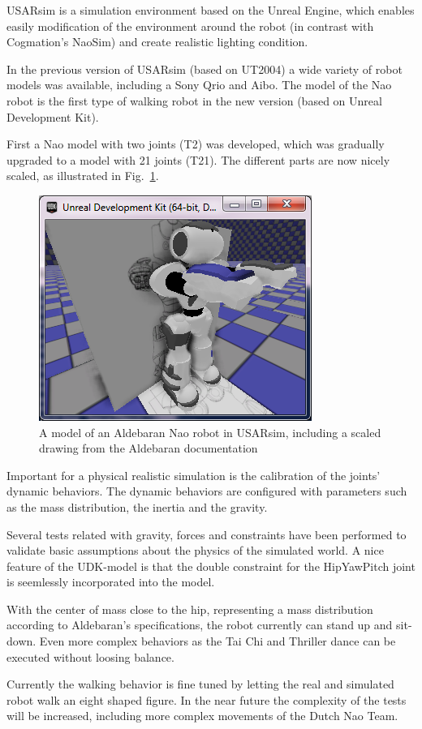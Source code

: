 \documentclass[11pt,a4paper,oneside]{article}
\begin{document}
USARsim is a simulation environment based on the Unreal Engine, which enables easily modification of the environment around the robot (in contrast with Cogmation's NaoSim) and create realistic lighting condition.  

In the previous version of USARsim (based on UT2004) a wide variety of robot models was available, including a Sony Qrio and Aibo. The model of the Nao robot is the first type of walking robot in the new version (based on Unreal Development Kit).  

First a Nao model with two joints (T2) was developed, which was gradually upgraded to a model with 21 joints (T21). The different parts are now nicely scaled, as illustrated in Fig.~\ref{fig:nao_scaled}.

\begin{figure}[hbt]        
\centering\includegraphics[width=.5\columnwidth]{nao33_correctheight.png}
\caption{A model of an Aldebaran Nao robot in USARsim, including a scaled drawing from the Aldebaran documentation}\label{fig:nao_scaled}
\end{figure}

Important for a physical realistic simulation is the calibration of the joints' dynamic behaviors. The dynamic behaviors are configured with parameters such as the mass distribution, the inertia and the gravity. 

Several tests related with gravity, forces and constraints have been performed to validate basic assumptions about the physics of the simulated world. A nice feature of the UDK-model is that the double constraint for the HipYawPitch joint is seemlessly incorporated into the model.

With the center of mass close to the hip, representing a mass distribution according to Aldebaran's specifications, the robot currently can stand up and sit-down. Even more complex behaviors as the Tai Chi and Thriller dance can be executed without loosing balance.

Currently the walking behavior is fine tuned by letting the real and simulated robot walk an eight shaped figure. In the near future the complexity of the tests will be increased, including more complex movements of the Dutch Nao Team.
\end{document}
